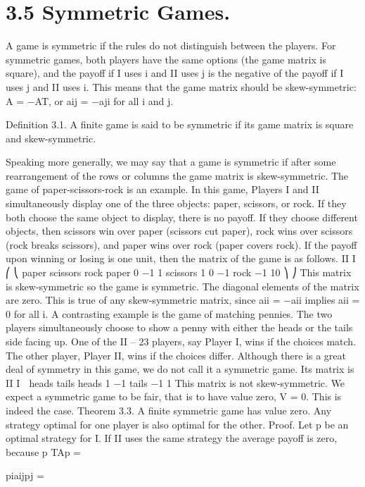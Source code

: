 \documentclass[]{report}
\begin{document}
\section{3.5 Symmetric Games.} A game is symmetric if the rules do not distinguish between
the players. For symmetric games, both players have the same options (the game matrix
is square), and the payoff if I uses i and II uses j is the negative of the payoff if I uses j
and II uses i. This means that the game matrix should be skew-symmetric: A = −AT,
or aij = −aji for all i and j.
\begin{framed}
Definition 3.1. A finite game is said to be symmetric if its game matrix is square and
skew-symmetric.
\end{framed}
Speaking more generally, we may say that a game is symmetric if after some rearrangement
of the rows or columns the game matrix is skew-symmetric.
The game of paper-scissors-rock is an example. In this game, Players I and II simultaneously
display one of the three objects: paper, scissors, or rock. If they both choose the
same object to display, there is no payoff. If they choose different objects, then scissors win
over paper (scissors cut paper), rock wins over scissors (rock breaks scissors), and paper
wins over rock (paper covers rock). If the payoff upon winning or losing is one unit, then
the matrix of the game is as follows.
II
I
⎛
⎝
paper scissors rock
paper 0 −1 1
scissors 1 0 −1
rock −1 10
⎞
⎠
This matrix is skew-symmetric so the game is symmetric. The diagonal elements of
the matrix are zero. This is true of any skew-symmetric matrix, since aii = −aii implies
aii = 0 for all i.
A contrasting example is the game of matching pennies. The two players simultaneously
choose to show a penny with either the heads or the tails side facing up. One of the
II – 23
players, say Player I, wins if the choices match. The other player, Player II, wins if the
choices differ. Although there is a great deal of symmetry in this game, we do not call it
a symmetric game. Its matrix is
II
I

heads tails
heads 1 −1
tails −1 1
This matrix is not skew-symmetric.
We expect a symmetric game to be fair, that is to have value zero, V = 0. This is
indeed the case.
Theorem 3.3. A finite symmetric game has value zero. Any strategy optimal for one
player is also optimal for the other.
Proof. Let p be an optimal strategy for I. If II uses the same strategy the average payoff
is zero, because
p
TAp = 

piaijpj = 
\end{document}
